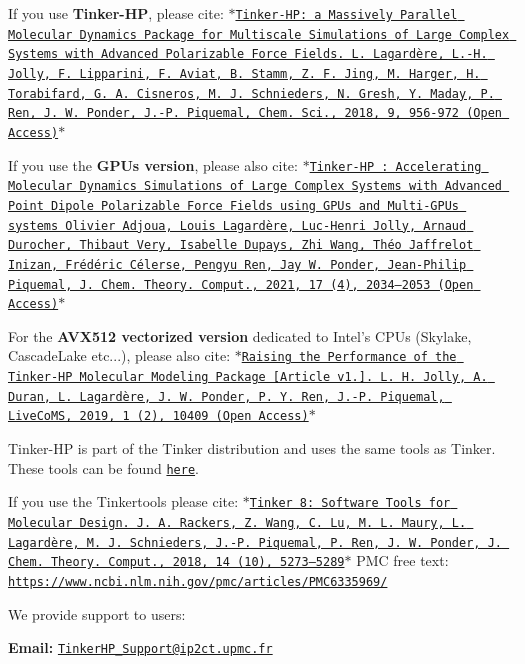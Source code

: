 \begin{DoxyItemize}
\item If you use {\bfseries Tinker-\/\-H\-P}, please cite\-: \href{https://doi.org/10.1039/C7SC04531J}{\tt $\ast$\-Tinker-\/\-H\-P\-: a Massively Parallel Molecular Dynamics Package for Multiscale Simulations of Large Complex Systems with Advanced Polarizable Force Fields. L. Lagardère, L.-\/\-H. Jolly, F. Lipparini, F. Aviat, B. Stamm, Z. F. Jing, M. Harger, H. Torabifard, G. A. Cisneros, M. J. Schnieders, N. Gresh, Y. Maday, P. Ren, J. W. Ponder, J.-\/\-P. Piquemal, Chem. Sci., 2018, 9, 956-\/972 (Open Access)$\ast$}
\item If you use the {\bfseries G\-P\-Us version}, please also cite\-: \href{https://doi.org/10.1021/acs.jctc.0c01164}{\tt $\ast$\-Tinker-\/\-H\-P \-: Accelerating Molecular Dynamics Simulations of Large Complex Systems with Advanced Point Dipole Polarizable Force Fields using G\-P\-Us and Multi-\/\-G\-P\-Us systems Olivier Adjoua, Louis Lagardère, Luc-\/\-Henri Jolly, Arnaud Durocher, Thibaut Very, Isabelle Dupays, Zhi Wang, Théo Jaffrelot Inizan, Frédéric Célerse, Pengyu Ren, Jay W. Ponder, Jean-\/\-Philip Piquemal, J. Chem. Theory. Comput., 2021, 17 (4), 2034–2053 (Open Access)$\ast$}
\item For the {\bfseries A\-V\-X512 vectorized version} dedicated to Intel's C\-P\-Us (Skylake, Cascade\-Lake etc...), please also cite\-: \href{https://doi.org/10.33011/livecoms.1.2.10409}{\tt $\ast$\-Raising the Performance of the Tinker-\/\-H\-P Molecular Modeling Package \mbox{[}Article v1.\mbox{]}. L. H. Jolly, A. Duran, L. Lagardère, J. W. Ponder, P. Y. Ren, J.-\/\-P. Piquemal, Live\-Co\-M\-S, 2019, 1 (2), 10409 (Open Access)$\ast$}
\end{DoxyItemize}

Tinker-\/\-H\-P is part of the Tinker distribution and uses the same tools as Tinker. These tools can be found \href{https://github.com/TinkerTools/tinker}{\tt here}.


\begin{DoxyItemize}
\item If you use the Tinkertools please cite\-: \href{http://dx.doi.org/10.1021/acs.jctc.8b00529}{\tt $\ast$\-Tinker 8\-: Software Tools for Molecular Design. J. A. Rackers, Z. Wang, C. Lu, M. L. Maury, L. Lagardère, M. J. Schnieders, J.-\/\-P. Piquemal, P. Ren, J. W. Ponder, J. Chem. Theory. Comput., 2018, 14 (10), 5273–5289$\ast$} P\-M\-C free text\-: \href{https://www.ncbi.nlm.nih.gov/pmc/articles/PMC6335969/}{\tt https\-://www.\-ncbi.\-nlm.\-nih.\-gov/pmc/articles/\-P\-M\-C6335969/} 


\end{DoxyItemize}

We provide support to users\-:

{\bfseries Email\-:} \href{mailto:TinkerHP_Support@ip2ct.upmc.fr}{\tt Tinker\-H\-P\-\_\-\-Support@ip2ct.\-upmc.\-fr} 